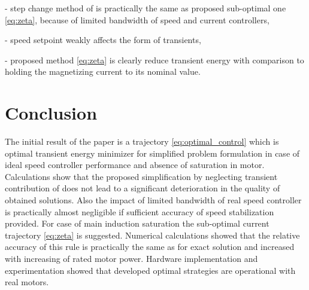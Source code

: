 \documentclass[journal]{IEEEtran}
\begin{document}
- step change method of  is practically the same as proposed sub-optimal one \eqref{eq:zeta}, because of limited bandwidth of speed and current controllers,

- speed setpoint weakly affects the form of transients,

- proposed method \eqref{eq:zeta} is clearly reduce transient energy with comparison to holding the magnetizing current to its nominal value.

\section*{Conclusion}

The initial result of the paper is a trajectory \eqref{eq:optimal_control} which is optimal transient energy minimizer for simplified problem formulation in case of ideal speed controller performance and absence of saturation in motor. Calculations show that the proposed simplification by neglecting transient contribution of  does not lead to a significant deterioration in the quality of obtained solutions.
Also the impact of limited bandwidth of real speed controller is practically almost negligible if sufficient accuracy of speed stabilization provided. For case of main induction saturation the sub-optimal current trajectory \eqref{eq:zeta} is suggested. Numerical calculations showed that the relative accuracy of this rule is practically the same as for exact solution and increased with increasing of rated motor power. Hardware implementation and experimentation showed that developed optimal strategies are operational with real motors.
\end{document}
